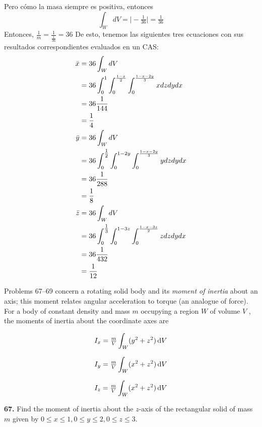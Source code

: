 \documentclass[11pt]{report}
\begin{document}
Pero cómo la masa siempre es positiva, entonces
\[\int_WdV=\Big|-\tfrac{1}{36}\Big|=\tfrac{1}{36}\]
Entonces, $\frac{1}{m}=\frac{1}{\frac{1}{36}}=36$
De esto, tenemos las siguientes tres ecuaciones con sus resultados correspondientes
evaluados en un CAS:
\begin{equation}
	\begin{split}
		\bar{x}&=36\int_WdV\\
			   &=36\int_0^1\int_0^{\frac{1-x}{2}}\int_0^{\frac{1-x-2y}{3}}xdzdydx\\
			   &=36\frac{1}{144}\\
			   &=\frac{1}{4}\\
		\bar{y}&=36\int_WdV\\
			   &=36\int_0^{\tfrac{1}{2}}\int_0^{1-2y}\int_0^{\frac{1-x-2y}{3}}ydzdydx\\
			   &=36\frac{1}{288}\\
			   &=\frac{1}{8}\\
		\bar{z}&=36\int_WdV\\
			   &=36\int_0^{\tfrac{1}{3}}\int_0^{1-3z}\int_0^{\frac{1-x-3z}{2}}zdzdydx\\
			   &=36\frac{1}{432}\\
			   &=\frac{1}{12}\\
	\end{split}
\end{equation}


Problems 67–69 concern a rotating solid body and its \textit{moment of inertia}
about an axis; this moment relates angular acceleration to torque (an analogue
of force). For a body of constant density and mass $m$ occupying a region $W$
of volume $V$ , the moments of inertia about the coordinate axes are

\[I_x = \tfrac{m}{V} \int _W (y^2 + z^2) \, \text d V \]

\[I_y = \tfrac{m}{V} \int _W (x^2 + z^2) \, \text d V \]

\[I_z = \tfrac{m}{V} \int _W (x^2 + z^2) \, \text d V \]

\textbf{67.} Find the moment of inertia about the $z$-axis of the rectangular
solid of mass $m$ given by $0 \leq x \leq 1, 0 \leq y \leq 2, 0 \leq z \leq 3$. \\
\end{document}
